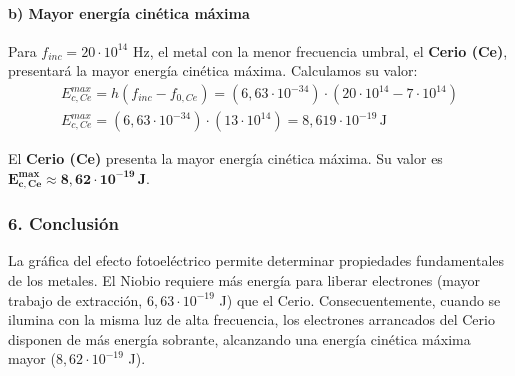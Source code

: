 \paragraph{b) Mayor energía cinética máxima}
Para $f_{inc} = 20 \cdot 10^{14}$ Hz, el metal con la menor frecuencia umbral, el \textbf{Cerio (Ce)}, presentará la mayor energía cinética máxima.
Calculamos su valor:
\begin{gather}
    E_{c,Ce}^{max} = h(f_{inc} - f_{0,Ce}) = (6,63 \cdot 10^{-34}) \cdot (20 \cdot 10^{14} - 7 \cdot 10^{14}) \nonumber \\
    E_{c,Ce}^{max} = (6,63 \cdot 10^{-34}) \cdot (13 \cdot 10^{14}) = 8,619 \cdot 10^{-19} \, \text{J}
\end{gather}
\begin{cajaresultado}
El \textbf{Cerio (Ce)} presenta la mayor energía cinética máxima. Su valor es $\boldsymbol{E_{c,Ce}^{max} \approx 8,62 \cdot 10^{-19} \, \textbf{J}}$.
\end{cajaresultado}

\subsubsection*{6. Conclusión}
\begin{cajaconclusion}
La gráfica del efecto fotoeléctrico permite determinar propiedades fundamentales de los metales. El Niobio requiere más energía para liberar electrones (mayor trabajo de extracción, $6,63 \cdot 10^{-19}$ J) que el Cerio. Consecuentemente, cuando se ilumina con la misma luz de alta frecuencia, los electrones arrancados del Cerio disponen de más energía sobrante, alcanzando una energía cinética máxima mayor ($8,62 \cdot 10^{-19}$ J).
\end{cajaconclusion}

\newpage